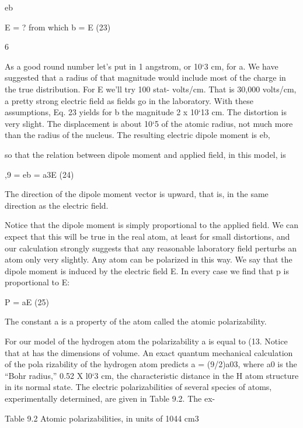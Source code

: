 \begin{equation}
\end{equation}
eb

E = ? from which b = E (23)

6

As a good round number let's put in 1 angstrom, or 10‘3 cm, for a.
We have suggested that a radius of that magnitude would include
most of the charge in the true distribution. For E we'll try 100 stat-
volts/cm. That is 30,000 volts/cm, a pretty strong electric field as
fields go in the laboratory. With these assumptions, Eq. 23 yields
for b the magnitude 2 x 10‘13 cm. The distortion is very slight. The
displacement is about 10‘5 of the atomic radius, not much more than
the radius of the nucleus. The resulting electric dipole moment is eb,

so that the relation between dipole moment and applied field, in this
model, is

\begin{equation}
\end{equation}
,9 = eb = a3E (24)

The direction of the dipole moment vector is upward, that is, in the
same direction as the electric field.

Notice that the dipole moment is simply proportional to the applied
field. We can expect that this will be true in the real atom, at
least for small distortions, and our calculation strongly suggests that
any reasonable laboratory field perturbs an atom only very slightly.
Any atom can be polarized in this way. We say that the dipole
moment is induced by the electric field E. In every case we find that
p is proportional to E:

\begin{equation}
\end{equation}
P = aE (25)

The constant a is a property of the atom called the atomic
polarizability.

For our model of the hydrogen atom the polarizability a is equal
to (13. Notice that at has the dimensions of volume. An exact
quantum mechanical calculation of the pola rizability of the hydrogen
atom predicts a = (9/2)a03, where a0 is the ``Bohr radius,''
0.52 X l0‘3 cm, the characteristic distance in the H atom structure
in its normal state. The electric polarizabilities of several species of
atoms, experimentally determined, are given in Table 9.2. The ex-

Table 9.2 Atomic polarizabilities, in units of 1044 cm3

